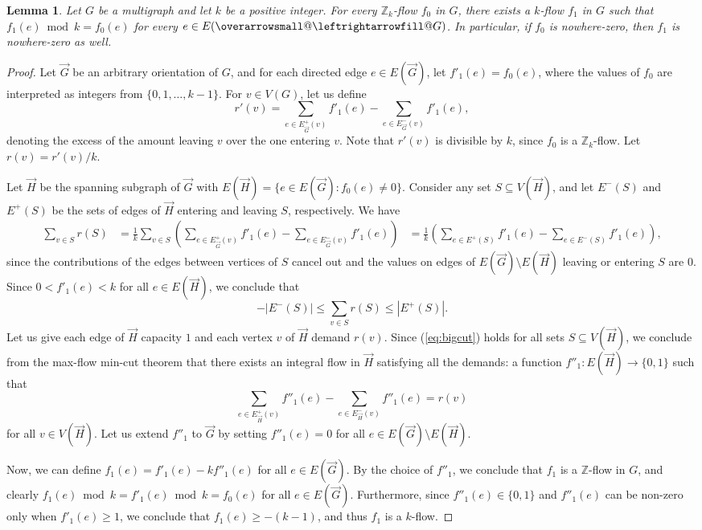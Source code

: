 \documentclass[12pt,twoside,openright,a4paper]{book}
\makeatletter
\newtheorem{lemma}[theorem]{Lemma}
\newcommand{\ovlr}{\mathpalette{\overarrowsmall@\leftrightarrowfill@}}
\newcommand{\overarrowsmall@}[3]{%
  \vbox{%
    \ialign{%
      ##\crcr
      #1{\smaller@style{#2}}\crcr
      \noalign{\nointerlineskip}%
      $\m@th\hfil#2#3\hfil$\crcr
    }%
  }%
}
\def\smaller@style#1{%
  \ifx#1\displaystyle\scriptstyle\else
    \ifx#1\textstyle\scriptstyle\else
      \scriptscriptstyle
    \fi
  \fi
}
\makeatother
\begin{document}
\begin{lemma}
Let $G$ be a multigraph and let $k$ be a positive integer.  For every $\mathbb{Z}_k$-flow $f_0$ in $G$, there exists
a $k$-flow $f_1$ in $G$ such that $f_1(e)\bmod k=f_0(e)$ for every $e\in E(\ovlr{G})$.  In particular, if $f_0$ is nowhere-zero,
then $f_1$ is nowhere-zero as well.
\end{lemma}
\begin{proof}
Let $\vec{G}$ be an arbitrary orientation of $G$, and for each directed edge $e\in E(\vec{G})$, let
$f'_1(e)=f_0(e)$, where the values of $f_0$ are interpreted as integers from $\{0,1,\ldots, k-1\}$.
For $v\in V(G)$, let us define
$$r'(v)=\sum_{e\in E^+_{\vec{G}}(v)} f'_1(e)-\sum_{e\in E^-_{\vec{G}}(v)} f'_1(e),$$
denoting the excess of the amount leaving $v$ over the one entering $v$.
Note that $r'(v)$ is divisible by $k$, since $f_0$ is a $\mathbb{Z}_k$-flow.
Let $r(v)=r'(v)/k$.

Let $\vec{H}$ be the spanning subgraph of $\vec{G}$ with $E(\vec{H})=\{e\in E(\vec{G}): f_0(e)\neq 0\}$.
Consider any set $S\subseteq V(\vec{H})$, and let $E^-(S)$ and $E^+(S)$ be the sets of edges of $\vec{H}$ entering
and leaving $S$, respectively.  We have
\begin{align*}
\sum_{v\in S} r(S)&=\frac{1}{k}\sum_{v\in S}\left(\sum_{e\in E^+_{\vec{G}}(v)} f'_1(e)-\sum_{e\in E^-_{\vec{G}}(v)} f'_1(e)\right)
&=\frac{1}{k}\left(\sum_{e\in E^+(S)} f'_1(e)-\sum_{e\in E^-(S)} f'_1(e)\right),
\end{align*}
since the contributions of the edges between vertices of $S$ cancel out and the values on edges of $E(\vec{G})\setminus E(\vec{H})$
leaving or entering $S$ are $0$.  Since $0<f'_1(e)<k$ for all $e\in E(\vec{H})$,
we conclude that
\begin{equation}\label{eq:bigcut}
-|E^-(S)|\le \sum_{v\in S} r(S)\le |E^+(S)|.
\end{equation}
Let us give each edge of $\vec{H}$ capacity $1$ and each vertex $v$ of $\vec{H}$ demand $r(v)$.
Since (\ref{eq:bigcut}) holds for all sets $S\subseteq V(\vec{H})$, we conclude from the max-flow min-cut theorem
that there exists an integral flow in $\vec{H}$ satisfying all the demands: a function $f''_1:E(\vec{H})\to\{0,1\}$ such that
$$\sum_{e\in E^+_{\vec{H}}(v)} f''_1(e)-\sum_{e\in E^-_{\vec{H}}(v)} f''_1(e)=r(v)$$
for all $v\in V(\vec{H})$.  Let us extend $f''_1$ to $\vec{G}$ by setting $f''_1(e)=0$ for all $e\in E(\vec{G})\setminus E(\vec{H})$.

Now, we can define $f_1(e)=f'_1(e)-kf''_1(e)$ for all $e\in E(\vec{G})$.  By the choice of $f''_1$, we conclude that $f_1$ is a $\mathbb{Z}$-flow
in $G$, and clearly $f_1(e)\bmod k = f'_1(e)\bmod k=f_0(e)$ for all $e\in E(\vec{G})$.  Furthermore, since $f''_1(e)\in \{0,1\}$
and $f''_1(e)$ can be non-zero only when $f'_1(e)\ge 1$, we conclude that $f_1(e)\ge -(k-1)$, and thus $f_1$ is a $k$-flow.
\end{proof}
\end{document}
